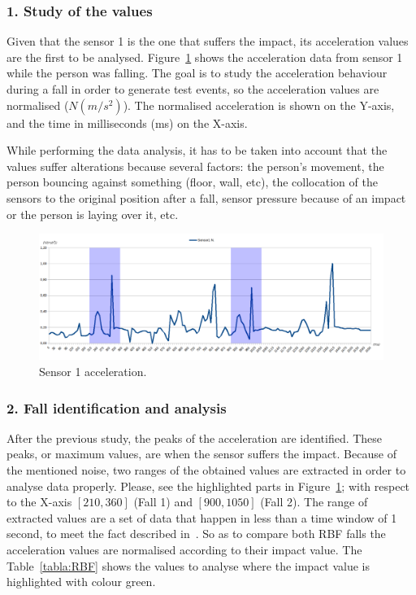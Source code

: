 \documentclass[review]{elsarticle}
\begin{document}
\subsubsection*{1. Study of the values} Given that the sensor 1 is the one that suffers the
impact, its acceleration values are the first to be analysed. Figure~\ref{fig:Sensor1Sombras} 
shows the acceleration data from sensor 1 while the person was falling. The goal is to study 
the acceleration behaviour during a fall in order to generate test events, so the acceleration 
values are normalised ($N(m/s^2)$). The normalised acceleration is
shown on the Y-axis, and the 
time in milliseconds (ms) on the X-axis.

While performing the data analysis, it has to be taken into account that the values suffer 
alterations because several factors: the person's movement, the person bouncing against something 
(floor, wall, etc), the collocation of the sensors to the original position after a fall, 
sensor pressure because of an impact or the person is laying over it, etc.

 \begin{figure}[!ht]
  \includegraphics[scale=0.255]{img/Sensor1Sombras}
  \caption[Sensor 1 acceleration]{Sensor 1 acceleration.}
  \label{fig:Sensor1Sombras}
\end{figure}

\subsubsection*{2. Fall identification and analysis} After the previous study, the peaks of the acceleration are identified. 
These peaks, or maximum values, are when the sensor suffers the
impact. Because of the mentioned noise, two ranges of the obtained 
values are extracted in order to analyse data properly. Please, see the highlighted parts in Figure~\ref{fig:Sensor1Sombras};
with respect to the X-axis $[210, 360]$ (Fall 1) and $[900, 1050]$ (Fall 2). The range of extracted values are a set of data that 
happen in less than a time window of 1 second, to meet the fact described in~\cite{Luder2009}. So as to compare both RBF falls
the acceleration values are normalised according to their impact value. The Table~\ref{tabla:RBF} 
shows the values to analyse where the impact value is highlighted with colour green.
\end{document}
